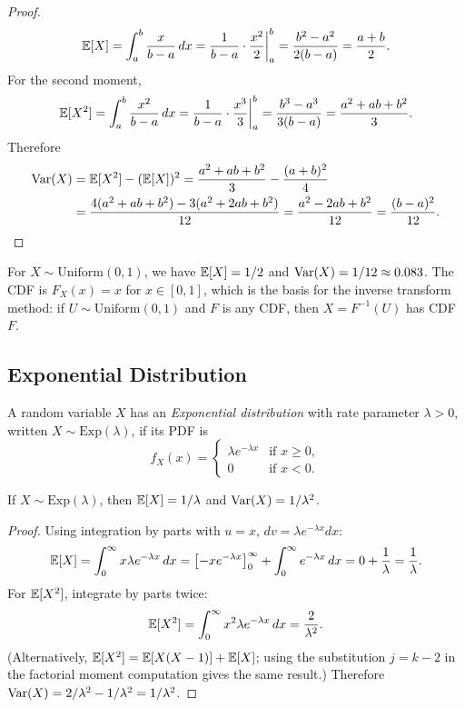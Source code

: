 \documentclass[11pt,a4paper]{article}
\begin{document}
\begin{proof}
\[
    \mathbb{E}[X] = \int_a^b \frac{x}{b-a} \, dx
    = \frac{1}{b-a} \cdot \frac{x^2}{2}\bigg|_a^b
    = \frac{b^2 - a^2}{2(b-a)}
    = \frac{a + b}{2}.
\]
For the second moment,
\[
    \mathbb{E}[X^2] = \int_a^b \frac{x^2}{b-a} \, dx
    = \frac{1}{b-a} \cdot \frac{x^3}{3}\bigg|_a^b
    = \frac{b^3 - a^3}{3(b-a)}
    = \frac{a^2 + ab + b^2}{3}.
\]
Therefore
\begin{align*}
    \operatorname{Var}(X) &= \mathbb{E}[X^2] - (\mathbb{E}[X])^2
    = \frac{a^2 + ab + b^2}{3} - \frac{(a+b)^2}{4} \\
    &= \frac{4(a^2 + ab + b^2) - 3(a^2 + 2ab + b^2)}{12}
    = \frac{a^2 - 2ab + b^2}{12}
    = \frac{(b-a)^2}{12}. \qedhere
\end{align*}
\end{proof}

\begin{example}
\label{ex:uniform_rng}
For $X \sim \mathrm{Uniform}(0, 1)$, we have $\mathbb{E}[X] = 1/2$ and
$\operatorname{Var}(X) = 1/12 \approx 0.083$. The CDF is $F_X(x) = x$ for
$x \in [0,1]$, which is the basis for the inverse transform method:
if $U \sim \mathrm{Uniform}(0,1)$ and $F$ is any CDF, then
$X = F^{-1}(U)$ has CDF $F$.
\end{example}

\subsection{Exponential Distribution}

\begin{definition}
\label{def:exponential}
A random variable $X$ has an \emph{Exponential distribution} with rate
parameter $\lambda > 0$, written $X \sim \mathrm{Exp}(\lambda)$, if its
PDF is
\[
    f_X(x) = \begin{cases}
        \lambda e^{-\lambda x} & \text{if } x \geq 0, \\
        0 & \text{if } x < 0.
    \end{cases}
\]
\end{definition}

\begin{proposition}
\label{prop:exponential_moments}
If $X \sim \mathrm{Exp}(\lambda)$, then $\mathbb{E}[X] = 1/\lambda$ and
$\operatorname{Var}(X) = 1/\lambda^2$.
\end{proposition}

\begin{proof}
Using integration by parts with $u = x$, $dv = \lambda e^{-\lambda x}dx$:
\[
    \mathbb{E}[X] = \int_0^\infty x \lambda e^{-\lambda x} \, dx
    = \left[-x e^{-\lambda x}\right]_0^\infty
    + \int_0^\infty e^{-\lambda x} \, dx
    = 0 + \frac{1}{\lambda}
    = \frac{1}{\lambda}.
\]
For $\mathbb{E}[X^2]$, integrate by parts twice:
\[
    \mathbb{E}[X^2] = \int_0^\infty x^2 \lambda e^{-\lambda x} \, dx
    = \frac{2}{\lambda^2}.
\]
(Alternatively, $\mathbb{E}[X^2] = \mathbb{E}[X(X-1)] + \mathbb{E}[X]$; using the substitution
$j = k-2$ in the factorial moment computation gives the same result.)
Therefore $\operatorname{Var}(X) = 2/\lambda^2 - 1/\lambda^2 = 1/\lambda^2$.
\end{proof}
\end{document}
